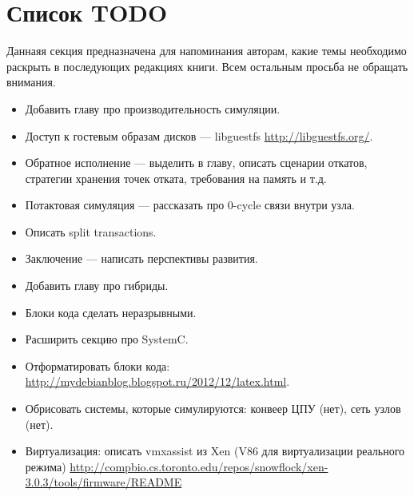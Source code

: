 
\section*{Список TODO}

Даннаяя секция предназначена для напоминания авторам, какие темы необходимо раскрыть в последующих редакциях книги. Всем остальным просьба не обращать внимания.

\begin{itemize}
    \item Добавить главу про производительность симуляции.
    \item Доступ к гостевым образам дисков — libguestfs \url{http://libguestfs.org/}.
    \item Обратное исполнение — выделить в главу, описать сценарии откатов, стратегии хранения точек отката, требования на память и т.д.
    \item Потактовая симуляция — рассказать про 0-cycle связи внутри узла.
    \item Описать split transactions.
    \item Заключение — написать перспективы развития.
	\item Добавить главу про гибриды.
	\item Блоки кода сделать неразрывными.
	\item Расширить секцию про SystemC.
	\item Отформатировать блоки кода: \url{http://mydebianblog.blogspot.ru/2012/12/latex.html}.
    \item Обрисовать системы, которые симулируются: конвеер ЦПУ (нет), сеть узлов (нет).
    \item Виртуализация: описать vmxassist из Xen (V86 для виртуализации реального режима) \url{http://compbio.cs.toronto.edu/repos/snowflock/xen-3.0.3/tools/firmware/README}
\end{itemize}


 

